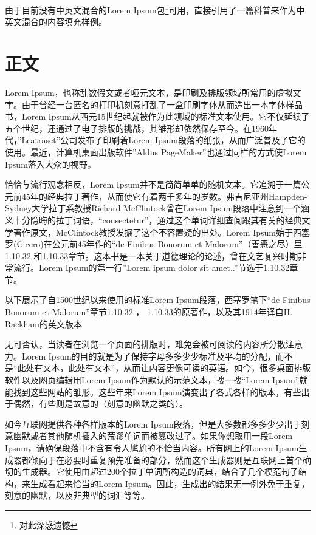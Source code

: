 \documentclass[10pt,openany]{book}
\begin{document}

由于目前没有中英文混合的Lorem Ipsum包\footnote{对此深感遗憾}可用，直接引用了一篇科普来作为中英文混合的内容填充样例。

\section*{正文}

Lorem Ipsum，也称乱数假文或者哑元文本，是印刷及排版领域所常用的虚拟文字。由于曾经一台匿名的打印机刻意打乱了一盒印刷字体从而造出一本字体样品书，Lorem Ipsum从西元15世纪起就被作为此领域的标准文本使用。它不仅延续了五个世纪，还通过了电子排版的挑战，其雏形却依然保存至今。在1960年代，”Leatraset”公司发布了印刷着Lorem Ipsum段落的纸张，从而广泛普及了它的使用。最近，计算机桌面出版软件”Aldus PageMaker”也通过同样的方式使Lorem Ipsum落入大众的视野。

恰恰与流行观念相反，Lorem Ipsum并不是简简单单的随机文本。它追溯于一篇公元前45年的经典拉丁著作，从而使它有着两千多年的岁数。弗吉尼亚州Hampden-Sydney大学拉丁系教授Richard McClintock曾在Lorem Ipsum段落中注意到一个涵义十分隐晦的拉丁词语，“consectetur”，通过这个单词详细查阅跟其有关的经典文学著作原文，McClintock教授发掘了这个不容置疑的出处。Lorem Ipsum始于西塞罗(Cicero)在公元前45年作的“de Finibus Bonorum et Malorum”（善恶之尽）里1.10.32 和1.10.33章节。这本书是一本关于道德理论的论述，曾在文艺复兴时期非常流行。Lorem Ipsum的第一行”Lorem ipsum dolor sit amet..”节选于1.10.32章节。

以下展示了自1500世纪以来使用的标准Lorem Ipsum段落，西塞罗笔下“de Finibus Bonorum et Malorum”章节1.10.32 ， 1.10.33的原著作，以及其1914年译自H. Rackham的英文版本

无可否认，当读者在浏览一个页面的排版时，难免会被可阅读的内容所分散注意力。Lorem Ipsum的目的就是为了保持字母多多少少标准及平均的分配，而不是“此处有文本，此处有文本”，从而让内容更像可读的英语。如今，很多桌面排版软件以及网页编辑用Lorem Ipsum作为默认的示范文本，搜一搜“Lorem Ipsum”就能找到这些网站的雏形。这些年来Lorem Ipsum演变出了各式各样的版本，有些出于偶然，有些则是故意的（刻意的幽默之类的）。

如今互联网提供各种各样版本的Lorem Ipsum段落，但是大多数都多多少少出于刻意幽默或者其他随机插入的荒谬单词而被篡改过了。如果你想取用一段Lorem Ipsum，请确保段落中不含有令人尴尬的不恰当内容。所有网上的Lorem Ipsum生成器都倾向于在必要时重复预先准备的部分，然而这个生成器则是互联网上首个确切的生成器。它使用由超过200个拉丁单词所构造的词典，结合了几个模范句子结构，来生成看起来恰当的Lorem Ipsum。因此，生成出的结果无一例外免于重复，刻意的幽默，以及非典型的词汇等等。
\end{document}
